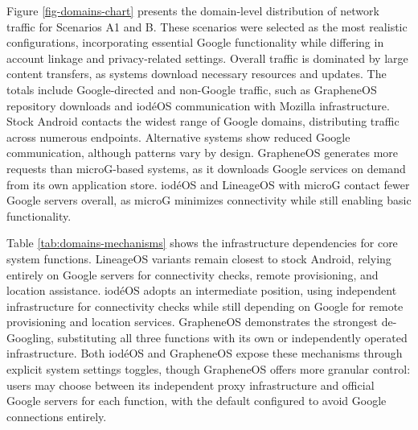 Figure \ref{fig-domains-chart} presents the domain-level distribution of network traffic for Scenarios A1 and B. These scenarios were selected as the most realistic configurations, incorporating essential Google functionality while differing in account linkage and privacy-related settings. Overall traffic is dominated by large content transfers, as systems download necessary resources and updates. The totals include Google-directed and non-Google traffic, such as GrapheneOS repository downloads and iod\'eOS communication with Mozilla infrastructure. Stock Android contacts the widest range of Google domains, distributing traffic across numerous endpoints. Alternative systems show reduced Google communication, although patterns vary by design. GrapheneOS generates more requests than microG-based systems, as it downloads Google services on demand from its own application store. iod\'eOS and LineageOS with microG contact fewer Google servers overall, as microG minimizes connectivity while still enabling basic functionality.

Table \ref{tab:domains-mechanisms} shows the infrastructure dependencies for core system functions. LineageOS variants remain closest to stock Android, relying entirely on Google servers for connectivity checks, remote provisioning, and location assistance. iod\'eOS adopts an intermediate position, using independent infrastructure for connectivity checks while still depending on Google for remote provisioning and location services. GrapheneOS demonstrates the strongest de-Googling, substituting all three functions with its own or independently operated infrastructure. Both iod\'eOS and GrapheneOS expose these mechanisms through explicit system settings toggles, though GrapheneOS offers more granular control: users may choose between its independent proxy infrastructure and official Google servers for each function, with the default configured to avoid Google connections entirely.

\begin{table}
	\caption{Domains observed for connectivity check, remote provisioning, and location assistance; ``--'' means not observed.}\label{tab:domains-mechanisms}
	\centering
\end{table}

